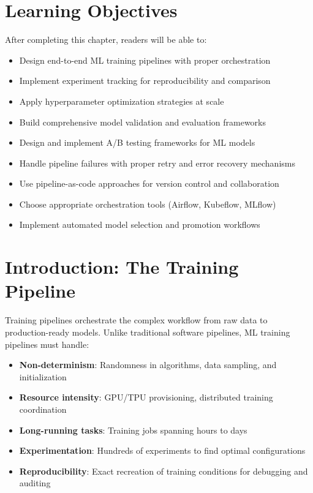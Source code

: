 \section{Learning Objectives}

After completing this chapter, readers will be able to:
\begin{itemize}
    \item Design end-to-end ML training pipelines with proper orchestration
    \item Implement experiment tracking for reproducibility and comparison
    \item Apply hyperparameter optimization strategies at scale
    \item Build comprehensive model validation and evaluation frameworks
    \item Design and implement A/B testing frameworks for ML models
    \item Handle pipeline failures with proper retry and error recovery mechanisms
    \item Use pipeline-as-code approaches for version control and collaboration
    \item Choose appropriate orchestration tools (Airflow, Kubeflow, MLflow)
    \item Implement automated model selection and promotion workflows
\end{itemize}

\section{Introduction: The Training Pipeline}

Training pipelines orchestrate the complex workflow from raw data to production-ready models. Unlike traditional software pipelines, ML training pipelines must handle:

\begin{itemize}
    \item \textbf{Non-determinism}: Randomness in algorithms, data sampling, and initialization
    \item \textbf{Resource intensity}: GPU/TPU provisioning, distributed training coordination
    \item \textbf{Long-running tasks}: Training jobs spanning hours to days
    \item \textbf{Experimentation}: Hundreds of experiments to find optimal configurations
    \item \textbf{Reproducibility}: Exact recreation of training conditions for debugging and auditing
\end{itemize}

